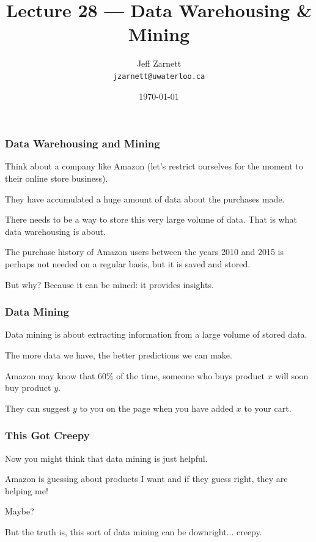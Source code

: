 

\title{Lecture 28 --- Data Warehousing \& Mining }

\author{Jeff Zarnett \\ \small \texttt{jzarnett@uwaterloo.ca}}
\date{\today}




\begin{frame}
  \titlepage

 \end{frame}
 
 
\begin{frame}
\frametitle{Data Warehousing and Mining}

Think about a company like Amazon (let's restrict ourselves for the moment to their online store business). 

They have accumulated a huge amount of data about the purchases made. 

There needs to be a way to store this very large volume of data. That is what data \alert{warehousing} is about. 

The purchase history of Amazon users between the years 2010 and 2015 is perhaps not needed on a regular basis, but it is saved and stored. 

But why? Because it can be \alert{mined}: it provides insights.

\end{frame}

\begin{frame}
\frametitle{Data Mining}

\alert{Data mining} is about extracting information from a large volume of stored data.  

The more data we have, the better predictions we can make. 

Amazon may know that 60\% of the time, someone who buys product $x$ will soon buy product $y$.

They can suggest $y$ to you on the page when you have added $x$ to your cart.


\end{frame}


\begin{frame}
\frametitle{This Got Creepy}

Now you might think that data mining is just helpful.

Amazon is guessing about products I want and if they guess right, they are helping me! 

Maybe? 

But the truth is, this sort of data mining can be downright... creepy.

\end{frame}

